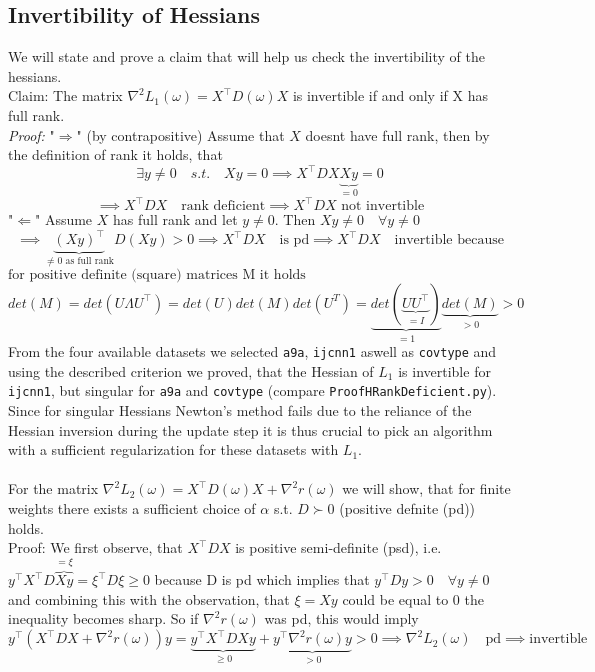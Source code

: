 \documentclass{article}
\begin{document}
\subsection{Invertibility of Hessians}
We will state and prove a claim that will help us check the invertibility of the hessians.\\
Claim: The matrix $ \nabla ^2 L_1(\omega) = X^\top D(\omega)X$ is invertible if and only if X has full rank.\\
\textit{Proof:}
"$ \Longrightarrow$" (by contrapositive)
Assume that $X$ doesnt have full rank, then by the definition of rank it holds, that
$$ \exists y \neq 0 \quad s.t. \quad Xy = 0 \implies X^\top DX\underbrace{Xy}_{=0} =0 $$
$$\implies X^\top DX \quad \text{rank deficient} \implies X^\top DX \text{ not invertible} $$
"$\Longleftarrow$" Assume $X$ has full rank and let $y\neq 0$. Then $ Xy \neq 0 \quad \forall y \neq 0$
$$ \implies \underbrace{(Xy)^\top}_{\neq 0 \text{ as full rank}} D (Xy) >0 \implies X^\top D X \quad \text{is pd} \implies X^\top DX \quad \text{invertible because}$$
$\text{for positive definite (square) matrices M it holds}$
$$det(M) = det (U\Lambda U^\top) = det(U) det(M) det(U^T) = \underbrace{det(\underbrace{U U^\top}_{=I})}_{=1}  \underbrace{det(M)}_{> 0} > 0$$
From the four available datasets we selected \texttt{a9a}, \texttt{ijcnn1} aswell as \texttt{covtype} and using the described criterion we proved, that the Hessian of $L_1$ is invertible for \texttt{ijcnn1}, but singular for \texttt{a9a} and \texttt{covtype} (compare \texttt{ProofHRankDeficient.py}). Since for singular Hessians Newton's method fails due to the reliance of the Hessian inversion during the update step it is thus crucial to pick an algorithm with a sufficient regularization for these datasets with $L_1$.\\
\\
%
For the matrix $\nabla ^2 L_2 (\omega) = X^\top D(\omega)X + \nabla ^2 r(\omega) $ we will show, that for finite weights there exists a sufficient choice of $\alpha$ s.t. $D \succ 0 $ (positive defnite (pd)) holds.\\
Proof: We first observe, that $ X^\top D X$ is positive semi-definite (psd), i.e.  $y^\top X^\top D \overbrace{Xy}^{= \xi} =  \xi^\top D \xi \geq 0 $
because D is pd which implies that $y^\top D y > 0 \quad \forall y \neq 0$ and combining this with the observation, that $\xi = Xy $ could be equal to $0$ the inequality becomes sharp. So if $\nabla ^2 r(\omega)$ was pd, this would imply
$$y^\top (X^\top DX + \nabla ^2 r(\omega))y = \underbrace{y^\top X^\top DXy}_{\geq 0} + \underbrace{y^\top \nabla ^2 r(\omega)y}_{>0 } > 0 \implies \nabla ^2 L_2 (\omega) \quad \text{pd} \implies \text{invertible}$$
\end{document}
